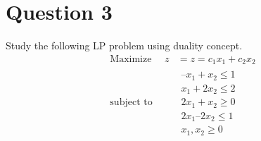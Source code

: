 \documentclass[12pt,a4paper]{article}
\begin{document}
\section*{Question 3}
Study the following LP problem using duality concept.
\begin{equation}
    \begin{aligned}
    \text{Maximize } \quad    z &= z = c_1x_1 + c_2x_2 \\
    \text{subject to }\quad &
        \begin{array}{c}
            –x_1 + x_2  \leq 1 \\
            x_1 + 2x_2  \leq 2 \\
           2x_1 + x_2 \geq 0 \\
           2x_1 – 2x_2  \leq 1 \\
            x_1,x_2 \geq 0
        \end{array}
    \end{aligned}
    \label{eq:problem_3}
\end{equation}
\end{document}
